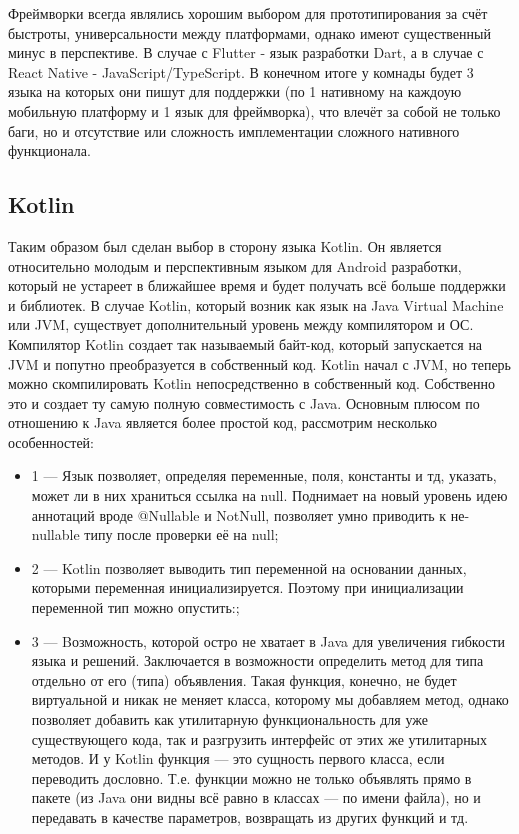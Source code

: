 Фреймворки всегда являлись хорошим выбором для прототипирования за счёт быстроты, универсальности между платформами, однако имеют существенный минус в перспективе. В случае с Flutter - язык разработки Dart, а в случае с React Native - JavaScript/TypeScript. В конечном итоге у комнады будет 3 языка на которых они пишут для поддержки (по 1 нативному на каждоую мобильную платформу и 1 язык для фреймворка), что влечёт за собой не только баги, но и отсутствие или сложность имплементации сложного нативного функционала.

\subsection{Kotlin}
Таким образом был сделан выбор в сторону языка Kotlin. Он является относительно молодым и перспективным языком для Android разработки, который не устареет в ближайшее время и будет получать всё больше поддержки и библиотек. В случае Kotlin, который возник как язык на Java Virtual Machine или JVM, существует дополнительный уровень между компилятором и ОС. Компилятор Kotlin создает так называемый байт-код, который запускается на JVM и попутно преобразуется в собственный код. Kotlin начал с JVM, но теперь можно скомпилировать Kotlin непосредственно в собственный код. Собственно это и создает ту самую полную совместимость с Java. Основным плюсом по отношению к Java является более простой код, рассмотрим несколько особенностей:

\begin{itemize}
 \item 1 — Язык позволяет, определяя переменные, поля, константы и тд, указать, может ли в них храниться ссылка на null. Поднимает на новый уровень идею аннотаций вроде @Nullable и NotNull, позволяет умно приводить к не-nullable типу после проверки её на null;
 \item 2 — Kotlin позволяет выводить тип переменной на основании данных, которыми переменная инициализируется. Поэтому при инициализации переменной тип можно опустить:;
 \item 3 — Bозможность, которой остро не хватает в Java для увеличения гибкости языка и решений. Заключается в возможности определить метод для типа отдельно от его (типа) объявления. Такая функция, конечно, не будет виртуальной и никак не меняет класса, которому мы добавляем метод, однако позволяет добавить как утилитарную функциональность для уже существующего кода, так и разгрузить интерфейс от этих же утилитарных методов. И у Kotlin функция — это сущность первого класса, если переводить дословно. Т.е. функции можно не только объявлять прямо в пакете (из Java они видны всё равно в классах — по имени файла), но и передавать в качестве параметров, возвращать из других функций и тд.
\end{itemize}
 
